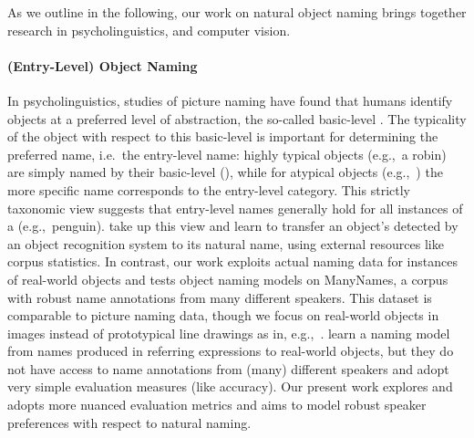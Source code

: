 

As we outline in the following, our work on natural object naming brings together  research in psycholinguistics, \langvis and computer vision. 

\paragraph{(Entry-Level) Object Naming}

%
In psycholinguistics, studies of picture naming have found that humans identify objects at a preferred level of abstraction, the so-called basic-level \cite{rosch1976basic,jolicoeur1984pictures}. 
The typicality of the object with respect to this basic-level \category is important for determining the preferred name, i.e.\ the entry-level name: highly typical objects (e.g.,\ a robin) are simply named by their basic-level \category (), while for atypical objects  (e.g.,\ ) the more specific name corresponds to the entry-level category. 
This strictly taxonomic view suggests that entry-level names generally hold for all instances of a \category (e.g.,\ penguin). 
 take up this view and learn to transfer an object's \category detected by an object recognition system to its natural name, using external resources like corpus statistics. 
In contrast, our work exploits actual naming data for instances of real-world objects and tests object naming models on ManyNames, a corpus with robust name annotations from many different speakers.
This dataset is comparable to picture naming data, though we focus on real-world objects in images instead of prototypical line drawings as in, e.g.,~.  
  learn a naming model from names produced in referring expressions to real-world objects, but they do not have access to name annotations from (many) different speakers and adopt very simple evaluation measures (like accuracy). 
Our present work explores and adopts more nuanced evaluation metrics and aims to model robust speaker preferences with respect to natural naming.
 
